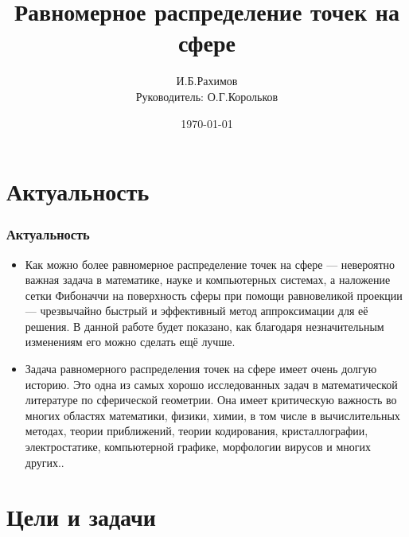 \documentclass[12pt, aspectratio=169]{beamer}
\title
{
    Равномерное распределение точек на сфере
}
\author
{
    И.Б.Рахимов \\
    Руководитель: О.Г.Корольков
}
\institute
{
    Воронежский Государственный Университет
}
\date
{
    \today
}
\begin{document}
\begin{frame}[plain]
    \maketitle
\end{frame}


\section{Актуальность}

\begin{frame}
\frametitle{Актуальность}

\begin{itemize}
    \item Как можно более равномерное распределение точек на сфере — невероятно важная задача в математике, науке и компьютерных системах, а наложение сетки Фибоначчи на поверхность сферы при помощи равновеликой проекции — чрезвычайно быстрый и эффективный метод аппроксимации для её решения. В данной работе будет показано, как благодаря незначительным изменениям его можно сделать ещё лучше.

    \item Задача равномерного распределения точек на сфере имеет очень долгую историю. Это одна из самых хорошо исследованных задач в математической литературе по сферической геометрии. Она имеет критическую важность во многих областях математики, физики, химии, в том числе в вычислительных методах, теории приближений, теории кодирования, кристаллографии, электростатике, компьютерной графике, морфологии вирусов и многих других..
\end{itemize}

\end{frame}


\section{Цели и задачи}
\end{document}
